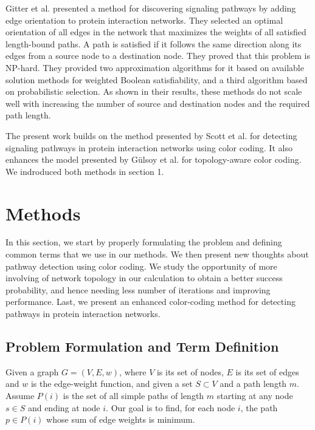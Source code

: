 \documentclass{ws-procs11x85}
\begin{document}
Gitter et al.\cite{gitter} presented a method for discovering signaling
pathways by adding edge orientation to protein interaction networks. They
selected an optimal orientation of all edges in the network that maximizes the
weights of all satisfied length-bound paths. A path is satisfied if it follows
the same direction along its edges from a source node to a destination node.
They proved that this problem is NP-hard. They provided two approximation
algorithms for it based on available solution methods for weighted Boolean
satisfiability, and a third algorithm based on probabilistic selection. As
shown in their results, these methods do not scale well with increasing the
number of source and destination nodes and the required path length.

The present work builds on the method presented by Scott et al.\cite{scott} for
detecting signaling pathways in protein interaction networks using color coding.
It also enhances the model presented by G{\"u}lsoy et al.\cite{gulsoy} for
topology-aware color coding. We indroduced both methods in section 1.

\section{Methods}

In this section, we start by properly formulating the problem and defining
common terms that we use in our methods. We then present new thoughts about
pathway detection using color coding. We study the opportunity of more involving
of network topology in our calculation to obtain a better success probability,
and hence needing less number of iterations and improving performance. Last, we
present an enhanced color-coding method for detecting pathways in protein
interaction networks.

\subsection{Problem Formulation and Term Definition}
Given a graph $G = (V, E, w)$, where $V$ is its set of nodes, $E$ is its set of
edges and $w$ is the edge-weight function, and given a set $S \subset V$ and a
path length $m$. Assume $P(i)$ is the set of all simple paths of length $m$
starting at any node $s \in S$ and ending at node $i$. Our goal is to find, for
each node $i$, the path $p \in P(i)$ whose sum of edge weights is minimum.
\end{document}
